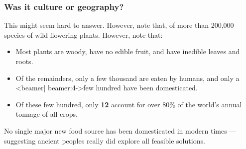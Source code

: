 
\begin{frame}
 \frametitle{Was it culture or geography?}

 This might seem hard to answer. However, note that, of more than 200,000 species
 of wild flowering plants.  However, note that:
 \begin{itemize}
 \item<2-> Most plants are woody, have no edible fruit, and have inedible
   leaves and roots.
 \item<3-> Of the remainders, only a \alert<beamer| beamer:4->{few
     thousand} are eaten by humans, and only a \alert<beamer|
   beamer:4->{few hundred} have been domesticated.
 \item<5-> Of these few hundred, only \textbf{12} account for over 80\%
   of the world's annual tonnage of all crops.
 \end{itemize}
 No single major new food source has been domesticated in modern
 times --- suggesting ancient peoples really did explore all feasible
 solutions.   
\end{frame}
